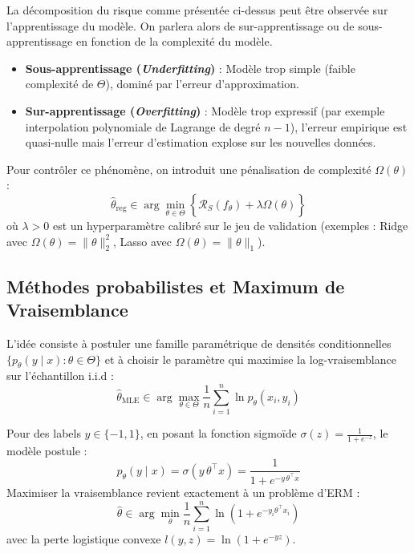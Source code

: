 La décomposition du risque comme présentée ci-dessus peut être observée sur l'apprentissage du modèle. On parlera alors de sur-apprentissage ou de sous-apprentissage en fonction de la complexité du modèle. 

\begin{itemize}
    \item \textbf{Sous-apprentissage (\emph{Underfitting})} : Modèle trop simple (faible complexité de $\Theta$), dominé par l'erreur d'approximation.
    \item \textbf{Sur-apprentissage (\emph{Overfitting})} : Modèle trop expressif (par exemple interpolation polynomiale de Lagrange de degré $n-1$), l'erreur empirique est quasi-nulle mais l'erreur d'estimation explose sur les nouvelles données.
\end{itemize}


Pour contrôler ce phénomène, on introduit une pénalisation de complexité $\Omega(\theta)$ :
\begin{equation}
    \hat{\theta}_{\text{reg}} \in \arg \min_{\theta \in \Theta} \left\{ \hat{\mathcal{R}}_S(f_\theta) + \lambda \Omega(\theta) \right\}
\end{equation}
où $\lambda > 0$ est un hyperparamètre calibré sur le jeu de validation (exemples : Ridge avec $\Omega(\theta) = \|\theta\|_2^2$, Lasso avec $\Omega(\theta) = \|\theta\|_1$).

\subsection{Méthodes probabilistes et Maximum de Vraisemblance}

L'idée consiste à postuler une famille paramétrique de densités conditionnelles $\{p_\theta(y \mid x) : \theta \in \Theta\}$ et à choisir le paramètre qui maximise la log-vraisemblance sur l'échantillon i.i.d :
\begin{equation}
    \hat{\theta}_{\text{MLE}} \in \arg \max_{\theta \in \Theta} \frac{1}{n} \sum_{i=1}^n \ln p_\theta(x_i, y_i)
\end{equation}

\begin{example}
    Pour des labels $y \in \{-1, 1\}$, en posant la fonction sigmoïde $\sigma(z) = \frac{1}{1 + e^{-z}}$, le modèle postule :
    \begin{equation}
        p_\theta(y \mid x) = \sigma(y \, \theta^\top x) = \frac{1}{1 + e^{-y \, \theta^\top x}}
    \end{equation}
    Maximiser la vraisemblance revient exactement à un problème d'ERM :
    \begin{equation}
        \hat{\theta} \in \arg \min_{\theta} \frac{1}{n} \sum_{i=1}^n \ln \left( 1 + e^{-y_i \theta^\top x_i} \right)
    \end{equation}
    avec la perte logistique convexe $l(y, z) = \ln(1 + e^{-yz})$.
\end{example}

